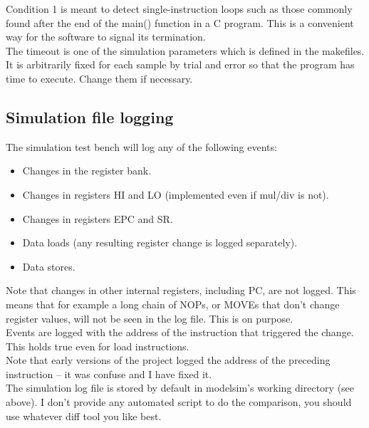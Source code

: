 \documentclass[11pt]{article}
\begin{document}
    Condition 1 is meant to detect single-instruction loops such as those
    commonly found after the end of the main() function in a C program. This is 
    a convenient way for the software to signal its termination.\\
    
    The timeout is one of the simulation parameters which is defined in
    the makefiles. It is arbitrarily fixed for each sample by trial and error 
    so that the program has time to execute. Change them if necessary.\\
    
\subsection{Simulation file logging}
\label{sim_logging}

    The simulation test bench will log any of the following events:

    \begin{itemize}
    \item Changes in the register bank.
    \item Changes in registers HI and LO (implemented even if mul/div is not).
    \item Changes in registers EPC and SR.
    \item Data loads (any resulting register change is logged separately).
    \item Data stores.
    \end{itemize}

    Note that changes in other internal registers, including PC, are not logged.
    This means that for example a long chain of NOPs, or MOVEs that don't change
    register values, will not be seen in the log file. This is on purpose.\\

    Events are logged with the address of the instruction that triggered 
    the change. This holds true even for load instructions.\\
    Note that early versions of the project logged the address of the 
    preceding instruction -- it was confuse and I have fixed it.\\

    The simulation log file is stored by default in modelsim's working directory
    (see above). I don't provide any automated script to do the comparison, you
    should use whatever diff tool you like best.\\
\end{document}
